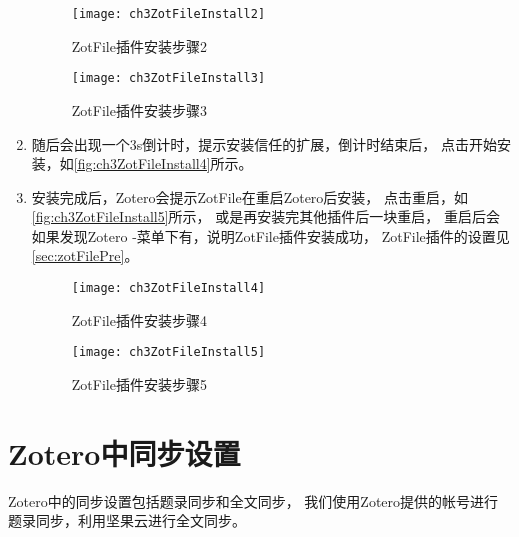 \documentclass[cn,11pt,chinese]{elegantbook}
\begin{document}
\begin{enumerate}
			\begin{figure}[htbp]
				\begin{minipage}[t]{0.6\linewidth}
					\centering
					\texttt{[image: ch3ZotFileInstall2]}
					\caption{ZotFile插件安装步骤2}
					\label{fig:ch3ZotFileInstall2}
				\end{minipage}
				\begin{minipage}[t]{0.3\linewidth}
					\centering
					\texttt{[image: ch3ZotFileInstall3]}
					\caption{ZotFile插件安装步骤3}
					\label{fig:ch3ZotFileInstall3}
				\end{minipage}
			\end{figure}
			\item
			随后会出现一个3s倒计时，提示安装信任的扩展，倒计时结束后，
			点击开始安装，如\autoref{fig:ch3ZotFileInstall4}所示。
			\item
			安装完成后，Zotero会提示ZotFile在重启Zotero后安装，
			点击重启，如\autoref{fig:ch3ZotFileInstall5}所示，
			或是再安装完其他插件后一块重启，
			重启后会如果发现Zotero -菜单下有，说明ZotFile插件安装成功，
			ZotFile插件的设置见\cref{sec:zotFilePre}。
			\begin{figure}[htbp]
				\centering
				\texttt{[image: ch3ZotFileInstall4]}
				\caption{ZotFile插件安装步骤4}
				\label{fig:ch3ZotFileInstall4}
			\end{figure}
			
			\begin{figure}[htbp]
				\centering
				\texttt{[image: ch3ZotFileInstall5]}
				\caption{ZotFile插件安装步骤5}
				\label{fig:ch3ZotFileInstall5}
			\end{figure}
		\end{enumerate}
		
	\section{Zotero中同步设置}\label{sec:syn}
		Zotero中的同步设置包括题录同步和全文同步，
		我们使用Zotero提供的帐号进行题录同步，利用坚果云进行全文同步。
		
\end{document}
